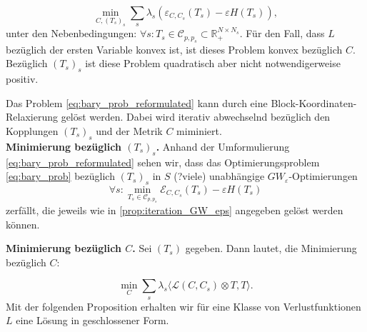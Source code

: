 \documentclass[11pt,a4paper]{article}
\numberwithin{equation}{section}
\begin{document}
	\begin{equation}
	\min_{C,(T_s)_s}{\sum_s{\lambda_s(\varepsilon_{C,C_s}(T_s) - \varepsilon H(T_s))}}, \label{eq:bary_prob_reformulated} 
	\end{equation}
	unter den Nebenbedingungen: $ \forall s: T_s \in \mathcal{C}_{p,p_s} \subset \mathbb{R}_{+}^{N \times N_s}$.
	Für den Fall, dass $L$ bezüglich der ersten Variable konvex ist, ist dieses Problem konvex bezüglich $C$. Bezüglich $(T_s)_s$ ist diese Problem quadratisch aber nicht notwendigerweise positiv.
	
	Das Problem \autoref{eq:bary_prob_reformulated} kann durch eine Block-Koordinaten-Relaxierung gelöst werden. Dabei wird iterativ abwechselnd bezüglich den Kopplungen $(T_s)_s$ und der Metrik $C$ miminiert.\\
	
	\noindent \textbf{Minimierung bezüglich $(T_s)_s$.}
	Anhand der Umformulierung \autoref{eq:bary_prob_reformulated} sehen wir, dass das Optimierungsproblem \autoref{eq:bary_prob} bezüglich $(T_s)_s$ in $S$ (?viele) unabhängige $GW_\varepsilon$-Optimierungen
	\begin{equation}
	\forall s : \min_{T_s \in \mathcal{C}_{p, p_s}}{\mathcal{E}_{C,C_s}(T_s)- \varepsilon H(T_s)}
	\end{equation}
	zerfällt, die jeweils wie in \autoref{prop:iteration_GW_eps} angegeben gelöst werden können.
	
	\noindent \textbf{Minimierung bezüglich $C$.} Sei $(T_s)$ gegeben. Dann lautet, die Minimierung bezüglich $C$:
	
	\begin{equation}
	\min_C \sum_s{\lambda_s \langle \mathcal{L}(C,C_s) \otimes T,T \rangle}. \label{eq:minimierung_C}
	\end{equation}
	Mit der folgenden Proposition erhalten wir für eine Klasse von Verlustfunktionen $L$ eine Lösung in geschlossener Form.
	
\end{document}
